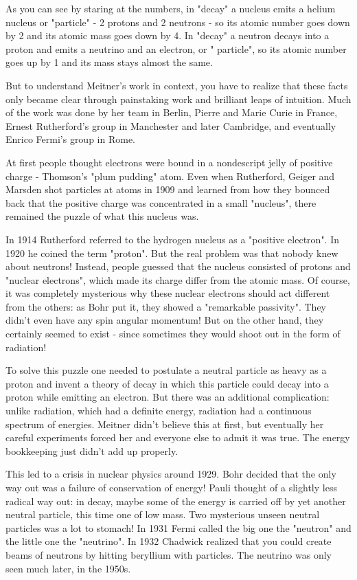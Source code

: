 $$
    
As you can see by staring at the numbers, in "\alpha  decay" a
nucleus emits a helium nucleus or "\alpha  particle" - 2 protons
and 2 neutrons - so its atomic number goes down by 2 and its atomic mass
goes down by 4.  In "\beta  decay" a neutron decays into a
proton and emits a neutrino and an electron, or "\beta 
particle", so its atomic number goes up by 1 and its mass stays
almost the same.

But to understand Meitner's work in context, you have to realize that
these facts only became clear through painstaking work and brilliant
leaps of intuition.  Much of the work was done by her team in Berlin,
Pierre and Marie Curie in France, Ernest Rutherford's group in
Manchester and later Cambridge, and eventually Enrico Fermi's group in
Rome.


At first people thought electrons were bound in a nondescript jelly of
positive charge - Thomson's "plum pudding" atom.  Even when
Rutherford, Geiger and Marsden shot \alpha  particles at atoms in 1909 and
learned from how they bounced back that the positive charge was
concentrated in a small "nucleus", there remained the puzzle
of what this nucleus was.


In 1914 Rutherford referred to the hydrogen nucleus as a "positive
electron".  In 1920 he coined the term "proton".  But the
real problem was that nobody knew about neutrons!  Instead, people
guessed that the nucleus consisted of protons and "nuclear
electrons", which made its charge differ from the atomic mass.  Of
course, it was completely mysterious why these nuclear electrons should
act different from the others: as Bohr put it, they showed a
"remarkable passivity".  They didn't even have any spin
angular momentum!  But on the other hand, they certainly seemed to exist
- since sometimes they would shoot out in the form of \beta  radiation!

To solve this puzzle one needed to postulate a neutral particle as heavy
as a proton and invent a theory of \beta  decay in which this particle could
decay into a proton while emitting an electron.  But there was an
additional complication: unlike \alpha  radiation, which had a definite
energy, \beta  radiation had a continuous spectrum of energies.  Meitner
didn't believe this at first, but eventually her careful experiments
forced her and everyone else to admit it was true.  The energy
bookkeeping just didn't add up properly.

This led to a crisis in nuclear physics around 1929.  Bohr decided that
the only way out was a failure of conservation of energy!  Pauli thought
of a slightly less radical way out: in \beta  decay, maybe some of the
energy is carried off by yet another neutral particle, this time one of
low mass.  Two mysterious unseen neutral particles was a lot to stomach!
In 1931 Fermi called the big one the "neutron" and the little
one the "neutrino".  In 1932 Chadwick realized that you could
create beams of neutrons by hitting beryllium with \alpha  particles.  The
neutrino was only seen much later, in the 1950s.

